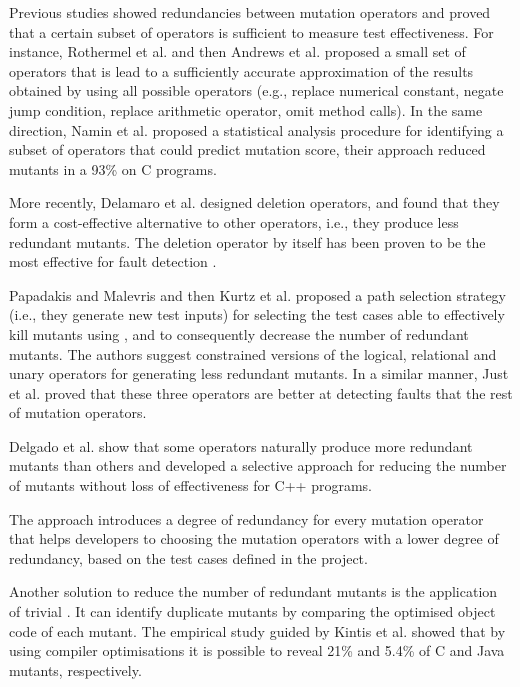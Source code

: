 Previous studies showed redundancies between mutation operators and proved that a certain subset of operators is sufficient to measure test effectiveness. For instance, Rothermel et al. \cite{rothermel1996experimental} and then Andrews et al. \cite{andrews2005mutation} proposed a small set of operators that is lead to a sufficiently accurate approximation of the results obtained by using all possible operators (e.g., replace numerical constant, negate jump condition, replace arithmetic operator, omit method calls). In the same direction, Namin et al. \cite{siami2008sufficient} proposed a statistical analysis procedure for identifying a subset of operators that could predict mutation score, their approach reduced mutants in a 93\% on C programs. 

More recently, Delamaro et al. \cite{delamaro2014designing} designed deletion operators, and found that they form a cost-effective alternative to other operators, i.e., they produce less redundant mutants. The deletion operator by itself has been proven to be the most effective for fault detection \cite{delamaro2014designing}.

Papadakis and Malevris \cite{papadakis2012mutation} and then Kurtz et al. \cite{kurtz2015static} proposed a path selection strategy (i.e., they generate new test inputs) for selecting the test cases able to effectively kill mutants using , and to consequently decrease the number of redundant mutants. 
The authors suggest constrained versions of the logical, relational and unary operators for generating less redundant mutants. 
In a similar manner, Just et al. \cite{just2012redundant,just2015higher} proved that these three operators are better at detecting faults that the rest of mutation operators.

Delgado et al. \cite{delgado2017assessment} show that some operators naturally produce more redundant mutants than others and
developed a selective approach for reducing the number of mutants without loss of effectiveness for C++ programs. 

The approach introduces a degree of redundancy for every mutation operator that helps developers to choosing the mutation operators with a lower degree of redundancy, based on the test cases defined in the project.

Another solution to reduce the number of redundant mutants is the application of trivial  \cite{papadakis2015trivial, kintis2017detecting,papadakis2019mutation}. 
It can identify duplicate mutants by comparing the optimised object code of each mutant. The empirical study guided by Kintis et al. \cite{kintis2017detecting} showed that by using compiler optimisations it is possible to reveal 21\% and 5.4\% of C and Java mutants, respectively.


